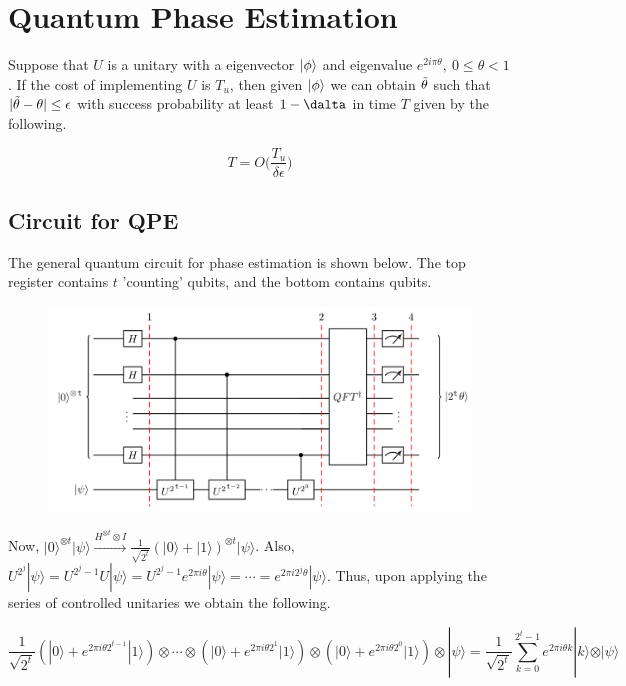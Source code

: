 \documentclass[11.5pt, paper=a4]{article}
\theoremstyle{definition}
\numberwithin{theorem}{section}
\begin{document}
\section{Quantum Phase Estimation}
Suppose that $U$ is a unitary with a eigenvector $\ket{\phi}$ and eigenvalue $e^{2i\pi \theta},\ 0\leq \theta < 1$. If the cost of implementing $U$ is $T_u$, then given $\ket{\phi}$ we can obtain $\Tilde{\theta}$ such that $|\Tilde{\theta} - \theta| \leq \epsilon$ with success probability at least $1 - \dalta$ in time $T$ given by the following.

$$T = O\big(\frac{T_u}{\delta \epsilon}\big)$$

\subsection{Circuit for QPE}
The general quantum circuit for phase estimation is shown below. The top register contains $t$ 'counting' qubits, and the bottom contains qubits.
\begin{figure}[!htbp]
    \centering
    \includegraphics[width=\linewidth]{images/qpe.png}
\end{figure}

Now, $\lvert 0 \rangle^{\otimes t} \lvert \psi \rangle \xrightarrow{H^{\otimes t}\otimes I} {\frac {1}{\sqrt{2^{ t}}}}\left(|0\rangle +|1\rangle \right)^{\otimes t} \lvert \psi \rangle$. Also, $U^{2^{j}}|\psi \rangle =U^{2^{j}-1}U|\psi \rangle =U^{2^{j}-1}e^{2\pi i\theta }|\psi \rangle =\cdots =e^{2\pi i2^{j}\theta }|\psi \rangle$. Thus, upon applying the series of controlled unitaries we obtain the following.

$$\frac {1}{\sqrt{2 ^ t}} \left(|0\rangle+{e^{{2\pi i} \theta 2^{t-1}}}|1\rangle \right) \otimes \cdots \otimes \left(|0\rangle+{e^{{2\pi i} \theta 2^{1}}}\vert1\rangle \right) \otimes \left(|0\rangle+{e^{{2\pi i} \theta 2^{0}}}\vert1\rangle \right) \otimes |\psi\rangle = \frac{1}{\sqrt{2 ^ t}}\sum _{k=0}^{2^{t}-1}e^{{2\pi i} \theta k}|k\rangle \otimes \vert\psi\rangle$$
\end{document}
